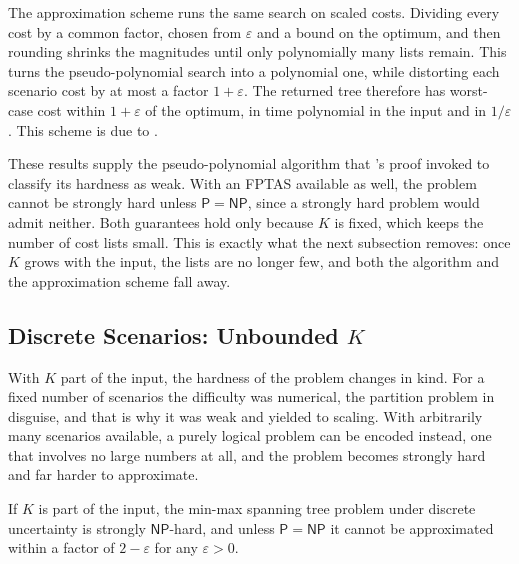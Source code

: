 The approximation scheme runs the same search on scaled costs.
Dividing every cost by a common factor, chosen from $\varepsilon$ and a bound on the optimum, and then rounding shrinks the magnitudes until only polynomially many lists remain. This turns the pseudo-polynomial search into a polynomial one, while distorting each scenario cost by at most a factor $1 + \varepsilon$.
The returned tree therefore has worst-case cost within $1 + \varepsilon$ of the optimum, in time polynomial in the input and in $1/\varepsilon$ \cite[Theorem~8.3]{Goerigk2021RCO}. This scheme is due to \textcite{AissiBazganVanderpooten2005ESA}.

These results supply the pseudo-polynomial algorithm that 's proof invoked to classify its hardness as weak. With an FPTAS available as well, the problem cannot be strongly hard unless $\mathsf{P} = \mathsf{NP}$, since a strongly hard problem would admit neither.
Both guarantees hold only because $K$ is fixed, which keeps the number of cost lists small. This is exactly what the next subsection removes: once $K$ grows with the input, the lists are no longer few, and both the algorithm and the approximation scheme fall away.


\subsection{Discrete Scenarios: Unbounded \texorpdfstring{$K$}{K}}

With $K$ part of the input, the hardness of the problem changes in kind.
For a fixed number of scenarios the difficulty was numerical, the partition problem in disguise, and that is why it was weak and yielded to scaling.
With arbitrarily many scenarios available, a purely logical problem can be encoded instead, one that involves no large numbers at all, and the problem becomes strongly hard and far harder to approximate.

\begin{theorem}\label{thm:mm-kunbdd-hard}
If $K$ is part of the input, the min-max spanning tree problem under discrete uncertainty is strongly $\mathsf{NP}$-hard, and unless $\mathsf{P} = \mathsf{NP}$ it cannot be approximated within a factor of $2 - \varepsilon$ for any $\varepsilon > 0$.
\end{theorem}

